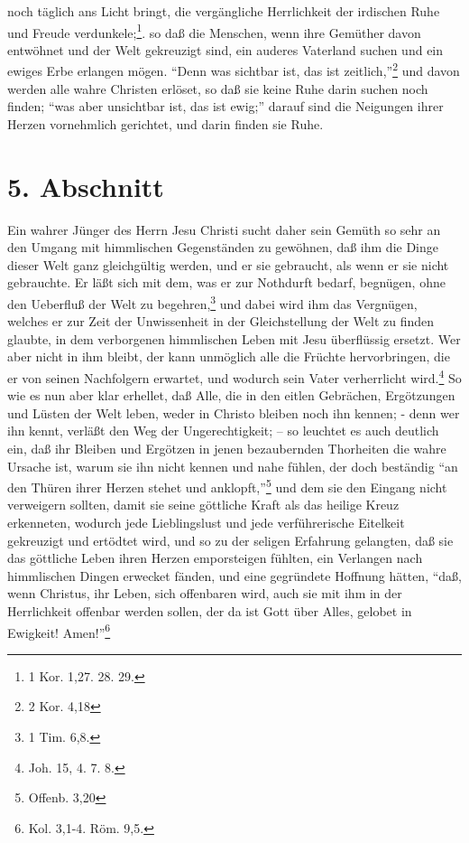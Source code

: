 noch täglich ans Licht bringt, die vergängliche Herrlichkeit der irdischen Ruhe und Freude verdunkele;\footnote{1 Kor. 1,27. 28. 29.}. so daß die Menschen, wenn ihre Gemüther davon entwöhnet und der Welt gekreuzigt sind, ein auderes Vaterland suchen und ein ewiges Erbe erlangen mögen. "`Denn was sichtbar ist, das ist zeitlich,"'\footnote{2 Kor. 4,18} und davon werden alle wahre Christen erlöset, so daß sie keine Ruhe darin suchen noch finden; "`was aber unsichtbar ist, das ist ewig;"' darauf sind die Neigungen ihrer Herzen vornehmlich gerichtet, und darin finden sie Ruhe.

\section{5. Abschnitt}

Ein wahrer Jünger des Herrn Jesu Christi sucht daher sein Gemüth so sehr an den Umgang mit himmlischen Gegenständen zu gewöhnen, daß ihm die Dinge dieser Welt ganz gleichgültig werden, und er sie gebraucht, als wenn er sie nicht gebrauchte. Er läßt sich mit dem, was er zur Nothdurft bedarf, begnügen, ohne den Ueberfluß der Welt zu begehren,\footnote{1 Tim. 6,8.} und dabei wird ihm das Vergnügen, welches er zur Zeit der Unwissenheit in der Gleichstellung der Welt zu finden glaubte, in dem verborgenen himmlischen Leben mit Jesu überflüssig ersetzt. Wer aber nicht in ihm bleibt, der kann unmöglich alle die Früchte hervorbringen, die er von seinen Nachfolgern erwartet, und wodurch sein Vater verherrlicht wird.\footnote{Joh. 15, 4. 7. 8.} So wie es nun aber klar erhellet, daß Alle, die in den eitlen Gebrächen, Ergötzungen und Lüsten der Welt leben, weder in Christo bleiben noch ihn kennen; - denn wer ihn kennt, verläßt den Weg der Ungerechtigkeit; -- so leuchtet es auch deutlich ein, daß ihr Bleiben und Ergötzen in jenen bezaubernden Thorheiten die wahre Ursache ist, warum sie ihn nicht kennen und nahe fühlen, der doch beständig "`an den Thüren ihrer Herzen stehet und anklopft,"'\footnote{Offenb. 3,20} und dem sie den Eingang nicht verweigern sollten, damit sie seine göttliche Kraft als das heilige Kreuz erkenneten, wodurch jede Lieblingslust und jede verführerische Eitelkeit gekreuzigt und ertödtet wird, und so zu der seligen Erfahrung gelangten, daß sie das göttliche Leben ihren Herzen emporsteigen fühlten, ein Verlangen nach himmlischen Dingen erwecket fänden, und eine gegründete Hoffnung hätten, "`daß, wenn Christus, ihr Leben, sich offenbaren wird, auch sie mit ihm in der Herrlichkeit offenbar werden sollen, der da ist Gott über Alles, gelobet in Ewigkeit! Amen!"'\footnote{Kol. 3,1-4. Röm. 9,5.}
